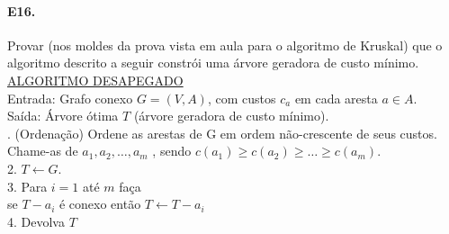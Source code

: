 \documentclass[11pt,a4paper,notitlepage]{exam}
\newcommand\Recebe{\leftarrow}
\begin{document}
\paragraph{E16.} Provar (nos moldes da prova vista em aula para o algoritmo de Kruskal) que o algoritmo
descrito a seguir constrói uma árvore geradora de custo mínimo.\\

\noindent
\underline{ALGORITMO DESAPEGADO}\\

\noindent
Entrada: Grafo conexo $G = (V, A)$, com custos $c_a$ em cada aresta $a \in A$.\\
Saída: Árvore ótima $T$ (árvore geradora de custo mínimo).\\

. (Ordenação) Ordene as arestas de G em ordem não-crescente de seus custos. Chame-as de \phantom{xxx}$a_1 , a_2 , \dots , a_m$ , sendo $c(a_1 ) \geq c(a_2 ) \geq \dots \geq c(a_m )$.\\
2. $T \Recebe G$.\\
3. Para $i = 1$ até $m$ faça\\
\hphantom{xxx}se $T - a_i$ é conexo então $T \Recebe T - a_i$\\
4. Devolva $T$
\end{document}
